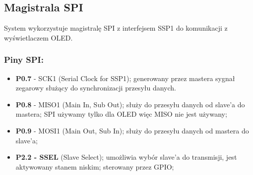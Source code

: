 \subsection{Magistrala SPI}
\label{spi}
System wykorzystuje magistralę SPI z interfejsem SSP1 do komunikacji z wyświetlaczem OLED. 
\subsubsection{Piny SPI:}
\label{piny}
\begin{itemize}
\item \textbf{P0.7} - SCK1 (Serial Clock for SSP1); generowany przez mastera sygnał zegarowy służący do synchronizacji przesyłu danych.
\item \textbf{P0.8} - MISO1 (Main In, Sub Out); służy do przesyłu danych od slave'a do mastera; SPI używamy tylko dla OLED więc MISO nie jest używany;
\item \textbf{P0.9} - MOSI1 (Main Out, Sub In); służy do przesyłu danych od mastera do slave'a;
\item \textbf{P2.2 - SSEL} (Slave Select); umożliwia wybór slave’a do transmisji, jest aktywowany stanem niskim; sterowany przez GPIO;
\end{itemize}
